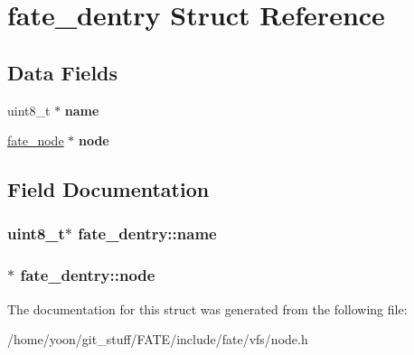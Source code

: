\hypertarget{structfate__dentry}{\section{fate\-\_\-dentry Struct Reference}
\label{structfate__dentry}
}
\subsection*{Data Fields}
\begin{DoxyCompactItemize}
\item 
\hypertarget{structfate__dentry_a425b274db813471b204f38b44e84f952}{uint8\-\_\-t $\ast$ {\bfseries name}}\label{structfate__dentry_a425b274db813471b204f38b44e84f952}

\item 
\hypertarget{structfate__dentry_a6ba969d485a9a5ee22fc52631075259c}{\hyperlink{structfate__node}{fate\-\_\-node} $\ast$ {\bfseries node}}\label{structfate__dentry_a6ba969d485a9a5ee22fc52631075259c}

\end{DoxyCompactItemize}


\subsection{Field Documentation}
\hypertarget{structfate__dentry_a425b274db813471b204f38b44e84f952}{
\subsubsection[{name}]{\setlength{\rightskip}{0pt plus 5cm}uint8\-\_\-t$\ast$ fate\-\_\-dentry\-::name}}\label{structfate__dentry_a425b274db813471b204f38b44e84f952}
\hypertarget{structfate__dentry_a6ba969d485a9a5ee22fc52631075259c}{
\subsubsection[{node}]{$\ast$ fate\-\_\-dentry\-::node}}\label{structfate__dentry_a6ba969d485a9a5ee22fc52631075259c}


The documentation for this struct was generated from the following file\-:\begin{DoxyCompactItemize}
\item 
/home/yoon/git\-\_\-stuff/\-F\-A\-T\-E/include/fate/vfs/node.\-h\end{DoxyCompactItemize}
